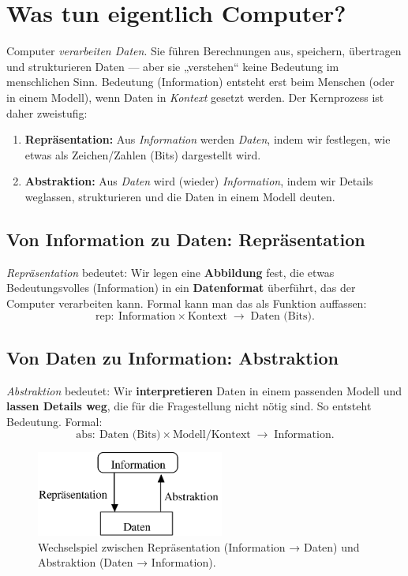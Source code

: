 \documentclass[../skript/main.tex]{subfiles}
\begin{document}
\section{Was tun eigentlich Computer?}

Computer \emph{verarbeiten Daten}. Sie führen Berechnungen aus, speichern, übertragen und strukturieren Daten — aber sie „verstehen“ keine Bedeutung im menschlichen Sinn. Bedeutung (Information) entsteht erst beim Menschen (oder in einem Modell), wenn Daten in \emph{Kontext} gesetzt werden. Der Kernprozess ist daher zweistufig:

\begin{enumerate}
	\item \textbf{Repräsentation:} Aus \emph{Information} werden \emph{Daten}, indem wir festlegen, wie etwas als Zeichen/Zahlen (Bits) dargestellt wird.
	\item \textbf{Abstraktion:} Aus \emph{Daten} wird (wieder) \emph{Information}, indem wir Details weglassen, strukturieren und die Daten in einem Modell deuten.
\end{enumerate}

\subsection{Von Information zu Daten: Repräsentation}

\emph{Repräsentation} bedeutet: Wir legen eine \textbf{Abbildung} fest, die etwas Bedeutungsvolles (Information) in ein \textbf{Datenformat} überführt, das der Computer verarbeiten kann.
Formal kann man das als Funktion auffassen:
\[
\mathrm{rep}:\ \text{Information} \times \text{Kontext} \;\to\; \text{Daten (Bits)}.
\]


\subsection{Von Daten zu Information: Abstraktion}

\emph{Abstraktion} bedeutet: Wir \textbf{interpretieren} Daten in einem passenden Modell und \textbf{lassen Details weg}, die für die Fragestellung nicht nötig sind. So entsteht Bedeutung.
Formal:
\[
\mathrm{abs}:\ \text{Daten (Bits)} \times \text{Modell/Kontext} \;\to\; \text{Information}.
\]

\begin{figure}[H]
	\centering
	\includegraphics[width=0.55\textwidth]{info-daten.png}%
	\caption{Wechselspiel zwischen Repräsentation (Information → Daten) und Abstraktion (Daten → Information).}
	\label{fig:info-daten}
\end{figure}
\end{document}
